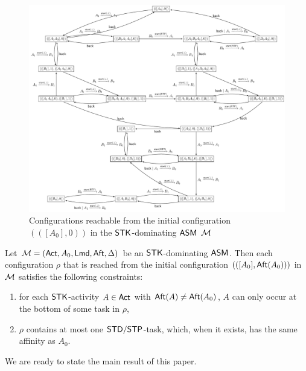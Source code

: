\begin{example}
\begin{figure}
			\includegraphics[scale = 0.6]{stk-asm-example.pdf}
			\caption{Configurations reachable from the initial configuration $(([A_0], 0))$ in the $\mathsf{STK}$-dominating $\textsf{ASM}$ ${\mathcal{M} }$}
		\label{stk-asm-example}
	\end{figure}

\end{example}


\begin{proposition}\label{prop-stk}
    Let ${\mathcal{M} }=({\sf Act},A_0,{\sf Lmd},{\sf Aft},\Delta)$ be an $\mathsf{STK}$-dominating $\textsf{ASM}$. Then each configuration $\rho$ that is reached from the initial configuration $(([A_0],{\sf Aft}(A_0)))$ in ${\mathcal{M} }$ satisfies the following constraints:
    \begin{enumerate}
        \item for each $\mathsf{STK}$-activity $A\in{\sf Act}$ with ${\sf Aft}(A)\neq{\sf Aft}(A_0)$, $A$ can only occur at the bottom of some task in $\rho$, 
        \item $\rho$ contains at most one ${\sf STD}/{\sf STP}$-task, which, when it exists, has the same affinity as $A_0$.
    \end{enumerate}
\end{proposition}

We are ready to state the main result of this paper. 

